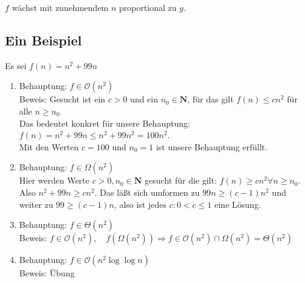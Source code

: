 \documentclass[ngerman,draft,parskip=half*,twoside]{scrreprt}
\theoremstyle{break}
\theoremstyle{nonumberbreak}
\newcommand*{\OO}{\mathcal{O}}      %
\begin{document}
$f$ wächst mit zunehmendem $n$ proportional zu $g$.

%
%

\subsection{Ein Beispiel}
Es sei $f(n) = n^2+99n$

\begin{enumerate}
\item   Behauptung: $f \in \OO(n^2)$\\
        Beweis: Gesucht ist ein $c>0$ und ein $n_0 \in \mathbf{N}$, für das gilt $f(n)\leq c n^2 $ 
        für alle $n\geq n_0$\\
        Das bedeutet konkret für unsere Behauptung:\\
        $f(n)= n^2+99n \leq n^2+99n^2 =100 n^2$.\\
        Mit den Werten $c=100$ und $n_0 = 1$ ist unsere Behauptung erfüllt.

\item   Behauptung: $f \in \Omega(n^2)$\\
        Hier werden Werte $c>0, n_0 \in \mathbf{N}$ gesucht für die gilt: $f(n) \geq c n^2\forall n\geq n_0$. Also $n^2+99n \geq
        c n^2$. Das läßt sich umformen zu $99n \geq (c-1)n^2$ und weiter zu $99 \geq (c-1)n$, also ist jedes $c\colon  0<c \leq 1$ eine
        Lösung.

\item   Behauptung: $f \in \Theta(n^2)$\\
        Beweis: $f \in \OO(n^2), \quad f(\Omega(n^2)) \Rightarrow f \in \OO(n^2)\cap \Omega(n^2)=\Theta(n^2)$

\item   Behauptung: $f \in \OO(n^2 \log\log n)$\\
        Beweis: Übung
\end{enumerate}
\end{document}
